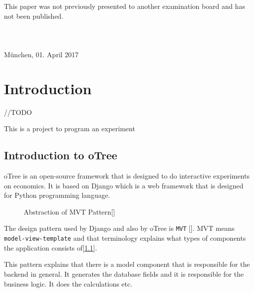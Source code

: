 This paper was not previously presented to another examination board and has not been published. \\\\\\\\

M\"{u}nchen, 01. April 2017

\newpage

\setcounter{page}{0} %
\pagestyle{headings}


\tableofcontents      %

\listoffigures

\listoftables
 
 

 


\chapter{Introduction } \label{cha:einleitung}

//TODO

This is a project to program an experiment 

\section{Introduction to oTree}\label{sec:intro}

oTree is an open-source framework that is designed to do interactive experiments on economics. It is based on Django which is a web framework that is designed for Python programming language.

\begin{figure}[h]
	\centerline{}
	\caption{Abstraction of MVT Pattern[\cite{DjangoOverview2017}]}
	\label{fig:picture2}
	
\end{figure}

The design pattern used by Django and also by oTree is \verb|MVT| [\cite{DjangoOverview2017}]. MVT means \verb|model-view-template| and that terminology explains what types of components the application consists of[\ref{fig:picture2}].  

This pattern explains that there is a model component that is responsible for the backend in general. It generates the database fields and it is responsible for the business logic. It does the calculations etc.

